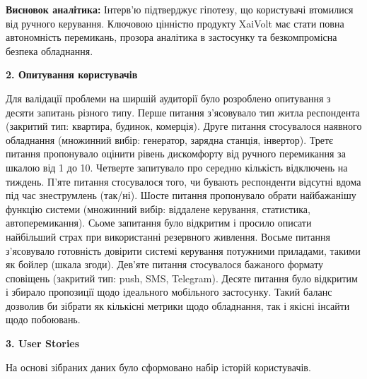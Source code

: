 \documentclass[14pt, a4paper]{extreport}
\begin{document}
	\textbf{Висновок аналітика:} Інтерв'ю підтверджує гіпотезу, що користувачі втомилися від ручного керування. Ключовою цінністю продукту XaiVolt має стати повна автономність перемикань, прозора аналітика в застосунку та безкомпромісна безпека обладнання.
	
	\textbf{2. Опитування користувачів}
	
	Для валідації проблеми на ширшій аудиторії було розроблено опитування з десяти запитань різного типу. Перше питання з'ясовувало тип житла респондента (закритий тип: квартира, будинок, комерція). Друге питання стосувалося наявного обладнання (множинний вибір: генератор, зарядна станція, інвертор). Третє питання пропонувало оцінити рівень дискомфорту від ручного перемикання за шкалою від 1 до 10. Четверте запитувало про середню кількість відключень на тиждень. П'яте питання стосувалося того, чи бувають респонденти відсутні вдома під час знеструмлень (так/ні). Шосте питання пропонувало обрати найбажанішу функцію системи (множинний вибір: віддалене керування, статистика, автоперемикання). Сьоме запитання було відкритим і просило описати найбільший страх при використанні резервного живлення. Восьме питання з'ясовувало готовність довірити системі керування потужними приладами, такими як бойлер (шкала згоди). Дев'яте питання стосувалося бажаного формату сповіщень (закритий тип: push, SMS, Telegram). Десяте питання було відкритим і збирало пропозиції щодо ідеального мобільного застосунку. Такий баланс дозволив би зібрати як кількісні метрики щодо обладнання, так і якісні інсайти щодо побоювань.
	
	\textbf{3. User Stories}
	
	На основі зібраних даних було сформовано набір історій користувачів. 
	
\end{document}
